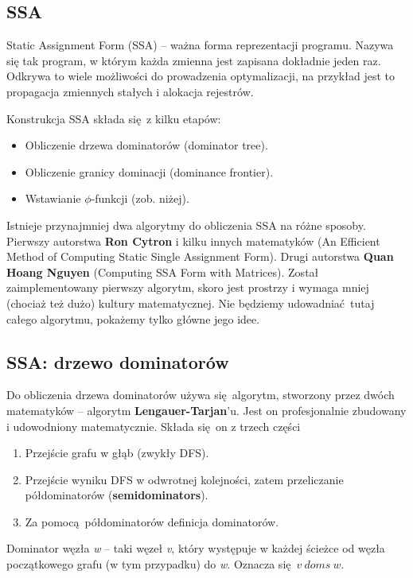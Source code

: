 \subsection{SSA}
	Static Assignment Form (SSA) -- ważna forma reprezentacji programu. Nazywa się
	tak program, w którym każda zmienna jest zapisana dokładnie jeden raz. Odkrywa
	to wiele możliwości do prowadzenia optymalizacji, na przykład jest to propagacja
	 zmiennych stałych i alokacja rejestrów.

	Konstrukcja SSA składa się z kilku etapów:
	\begin{itemize}
		\item Obliczenie drzewa dominatorów (dominator tree).
		\item Obliczenie granicy dominacji (dominance frontier).
		\item Wstawianie $\phi$-funkcji (zob. niżej).
	\end{itemize}
	Istnieje przynajmniej dwa algorytmy do obliczenia SSA na różne sposoby. Pierwszy
	autorstwa \textbf{Ron Cytron} i kilku innych matematyków (An Efficient
	Method of Computing Static Single Assignment Form). Drugi autorstwa
	\textbf{Quan Hoang Nguyen} (Computing SSA Form with Matrices). Został
	zaimplementowany pierwszy algorytm, skoro jest prostrzy i wymaga mniej (chociaż
	też dużo) kultury matematycznej. Nie będziemy udowadniać tutaj całego algorytmu,
	pokażemy tylko główne jego idee.
	
	\subsection{SSA: drzewo dominatorów}
		Do obliczenia drzewa dominatorów używa się algorytm, stworzony przez dwóch
		matematyków -- algorytm \textbf{Lengauer-Tarjan}'u. Jest on profesjonalnie
		zbudowany i udowodniony matematycznie. Składa się on z trzech części
		\begin{enumerate}
			\item Przejście grafu w głąb (zwykły DFS).
			\item Przejście wyniku DFS w odwrotnej kolejności, zatem przeliczanie
			      półdominatorów (\textbf{semidominators}).
	      	\item Za pomocą półdominatorów definicja dominatorów.
		\end{enumerate}

		\spacing
		
		Dominator węzła \textit{w} -- taki węzeł \textit{v}, który występuje w każdej ścieżce od
		węzła początkowego grafu (w tym przypadku) do \textit{w}. Oznacza się $v \ doms \ w$.
		\\

